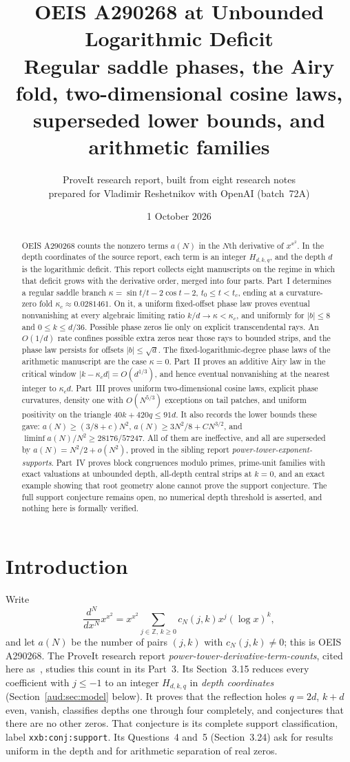 \documentclass[11pt,a4paper]{article}
\title{OEIS A290268 at Unbounded Logarithmic Deficit\\[6pt]
\large Regular saddle phases, the Airy fold, two-dimensional cosine laws,\\
superseded lower bounds, and arithmetic families}
\author{ProveIt research report, built from eight research notes\\
prepared for Vladimir Reshetnikov with OpenAI (batch~72A)}
\date{1 October 2026}
\numberwithin{equation}{section}
\begin{document}
\maketitle
\begin{abstract}
OEIS A290268 counts the nonzero terms $a(N)$ in the $N$th derivative of $x^{x^2}$. In the depth coordinates of the source report, each term is an integer $H_{d,k,q}$, and the depth $d$ is the logarithmic deficit. This report collects eight manuscripts on the regime in which that deficit grows with the derivative order, merged into four parts. Part~I determines a regular saddle branch $\kappa=\sin t/t-2\cos t-2$, $t_0\le t<t_c$, ending at a curvature-zero fold $\kappa_c\approx0.0281461$. On it, a uniform fixed-offset phase law proves eventual nonvanishing at every algebraic limiting ratio $k/d\to\kappa<\kappa_c$, and uniformly for $|b|\le8$ and $0\le k\le d/36$. Possible phase zeros lie only on explicit transcendental rays. An $O(1/d)$ rate confines possible extra zeros near those rays to bounded strips, and the phase law persists for offsets $|b|\le\sqrt d$. The fixed-logarithmic-degree phase laws of the arithmetic manuscript are the case $\kappa=0$. Part~II proves an additive Airy law in the critical window $|k-\kappa_cd|=O(d^{1/3})$, and hence eventual nonvanishing at the nearest integer to $\kappa_cd$. Part~III proves uniform two-dimensional cosine laws, explicit phase curvatures, density one with $O(N^{5/3})$ exceptions on tail patches, and uniform positivity on the triangle $40k+420q\le91d$. It also records the lower bounds these gave: $a(N)\ge(3/8+c)N^2$, $a(N)\ge3N^2/8+CN^{3/2}$, and $\liminf a(N)/N^2\ge28176/57247$. All of them are ineffective, and all are superseded by $a(N)=N^2/2+o(N^2)$, proved in the sibling report \emph{power-tower-exponent-supports}. Part~IV proves block congruences modulo primes, prime-unit families with exact valuations at unbounded depth, all-depth central strips at $k=0$, and an exact example showing that root geometry alone cannot prove the support conjecture. The full support conjecture remains open, no numerical depth threshold is asserted, and nothing here is formally verified.
\end{abstract}
\tableofcontents
\clearpage

\section{Introduction}\label{aud:sec:intro}
Write
\[
 \frac{d^N}{dx^N}x^{x^2}
 =x^{x^2}\sum_{j\in\mathbb Z,\,k\ge0}c_N(j,k)x^j(\log x)^k,
\]
and let $a(N)$ be the number of pairs $(j,k)$ with $c_N(j,k)\ne0$; this is OEIS A290268. The ProveIt research report \emph{power-tower-derivative-term-counts}, cited here as~\cite{source}, studies this count in its Part~3. Its Section~3.15 reduces every coefficient with $j\le-1$ to an integer $H_{d,k,q}$ in \emph{depth coordinates} (Section~\ref{aud:sec:model} below). It proves that the reflection holes $q=2d$, $k+d$ even, vanish, classifies depths one through four completely, and conjectures that there are no other zeros. That conjecture is its complete support classification, label \texttt{xxb:conj:support}. Its Questions~4 and~5 (Section~3.24) ask for results uniform in the depth and for arithmetic separation of real zeros.
\end{document}
